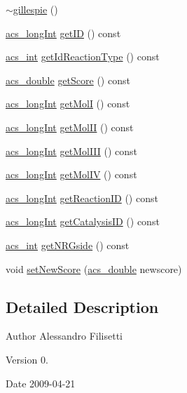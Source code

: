 \begin{DoxyCompactItemize}
\item 
\hyperlink{a00012_a33a97651932d8f82d82d164c94a2eae7}{$\sim$gillespie} ()
\item 
\hyperlink{a00024_a19319d75f02db4308bc5c0026d98cd85}{acs\-\_\-long\-Int} \hyperlink{a00012_a6aba3b283efc955bd4869f663ab877d6}{get\-I\-D} () const 
\item 
\hyperlink{a00024_a8d277355641a098190360234e2ebde35}{acs\-\_\-int} \hyperlink{a00012_a25d1e86363cdd7fabbb624b85620d1db}{get\-Id\-Reaction\-Type} () const 
\item 
\hyperlink{a00024_ab776853a005fcbf56af0424a2a4dd607}{acs\-\_\-double} \hyperlink{a00012_aa0ba52c30f6172a034e3b29afd074106}{get\-Score} () const 
\item 
\hyperlink{a00024_a19319d75f02db4308bc5c0026d98cd85}{acs\-\_\-long\-Int} \hyperlink{a00012_a8de52ad4b41daa64e69c897541b69629}{get\-Mol\-I} () const 
\item 
\hyperlink{a00024_a19319d75f02db4308bc5c0026d98cd85}{acs\-\_\-long\-Int} \hyperlink{a00012_a842457bf58d6af34b992a2c3fe27e4f6}{get\-Mol\-I\-I} () const 
\item 
\hyperlink{a00024_a19319d75f02db4308bc5c0026d98cd85}{acs\-\_\-long\-Int} \hyperlink{a00012_ab3d608ab2016a5a06408a76a1d12aabf}{get\-Mol\-I\-I\-I} () const 
\item 
\hyperlink{a00024_a19319d75f02db4308bc5c0026d98cd85}{acs\-\_\-long\-Int} \hyperlink{a00012_a01e1fb80634ae8fd32ce20fd7b5181ba}{get\-Mol\-I\-V} () const 
\item 
\hyperlink{a00024_a19319d75f02db4308bc5c0026d98cd85}{acs\-\_\-long\-Int} \hyperlink{a00012_a8d4daffecd91b32fb59a94eae6de8d0e}{get\-Reaction\-I\-D} () const 
\item 
\hyperlink{a00024_a19319d75f02db4308bc5c0026d98cd85}{acs\-\_\-long\-Int} \hyperlink{a00012_a0f2202c3d3662ce7cec6b127f066f715}{get\-Catalysis\-I\-D} () const 
\item 
\hyperlink{a00024_a8d277355641a098190360234e2ebde35}{acs\-\_\-int} \hyperlink{a00012_ad668afc14941b6842c703046a1a2d4c1}{get\-N\-R\-Gside} () const 
\item 
void \hyperlink{a00012_a43ac16698f9e047c7384b4219f9e5e86}{set\-New\-Score} (\hyperlink{a00024_ab776853a005fcbf56af0424a2a4dd607}{acs\-\_\-double} newscore)
\end{DoxyCompactItemize}


\subsection{Detailed Description}
\begin{DoxyAuthor}{Author}
Alessandro Filisetti 
\end{DoxyAuthor}
\begin{DoxyVersion}{Version}
0. 
\end{DoxyVersion}
\begin{DoxyDate}{Date}
2009-\/04-\/21 
\end{DoxyDate}


